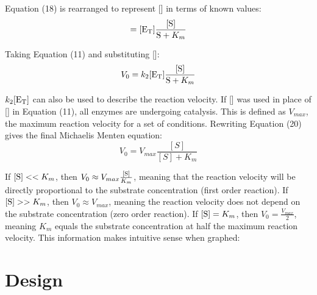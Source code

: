 \documentclass{article}
\begin{document}
Equation (18) is rearranged to represent [] in terms of known values:
\begin{equation}
    [\ce{ES}] = [\ce{E_T}]\frac{[\ce{S}]}{\ce{S} + K_m}
\end{equation}

Taking Equation (11) and substituting []:
\begin{equation}
    V_0 = k_2[\ce{E_T}]\frac{[\ce{S}]}{\ce{S} + K_m}
\end{equation}

$k_2[\ce{E_T}]$ can also be used to describe the reaction velocity. If [] was used in place of [] in Equation (11), all enzymes are undergoing catalysis. This is defined as $V_{max}$, the maximum reaction velocity for a set of conditions. Rewriting Equation (20) gives the final Michaelis Menten equation:
\begin{equation}
    V_0 = V_{max}\frac{[S]}{[S] + K_m}
\end{equation}

If $[\ce{S}] << K_m$, then $V_0 \approx V_{max}\frac{[\ce{S}]}{K_m}$, meaning that the reaction velocity will be directly proportional to the substrate concentration (first order reaction). If $[\ce{S}] >> K_m$, then $V_0 \approx V_{max}$, meaning the reaction velocity does not depend on the substrate concentration (zero order reaction). If $[\ce{S}] = K_m$, then $V_0 = \frac{V_{max}}{2}$, meaning $K_m$ equals the substrate concentration at half the maximum reaction velocity. This information makes intuitive sense when graphed:

\section{Design}

\newpage
\end{document}

